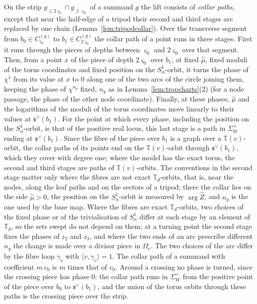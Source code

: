 On the strip $g_{\le2\varsigma_0}\cap g_{\ge\varsigma_0}$ of a summand $g$ the lift consists of \emph{collar paths}, except
that near the half-edge of a tripod their second and third stages are replaced by one chain
(Lemma~\ref{lem:tripodcollar}). Over the transverse segment from
$b_0\in C^{(g)}_{\varsigma_0}$ to $b_1\in C^{(g)}_{2\varsigma_0}$ the collar path of a point runs in three stages. First it runs
through the pieces of depths between $\varsigma_0$ and $2\varsigma_0$ over that segment. Then, from a point $x$ of the piece
of depth $2\varsigma_0$ over $b_1$, at fixed $\hat\mu$, fixed moduli of the torus coordinates and fixed position on the
$S^1_\alpha$-orbit, it turns the phase of $\chi^{\tilde v}$ from its value at $x$ to $0$ along one of the two arcs of the
circle joining them, keeping the phase of $\chi^{n_y}$ fixed, $n_y$ as in Lemma~\ref{lem:tropcharts}(2) (for a node passage,
the phase of the other node coordinate). Finally, at these phases, $\hat\mu$ and the logarithms of the moduli of the torus
coordinates move linearly to their values at $\mathfrak s^\vee(b_1)$. For the point at which every phase, including the
position on the $S^1_\alpha$-orbit, is that of the positive real locus, this last stage is a path in $\Sigma^+_W$ ending
at $\mathfrak s^\vee(b_1)$. Since the fibre of the piece over $b_1$ is a graph over a $\mathbb T(v)$-orbit, the collar paths
of its points end on the $\mathbb T(v)$-orbit through $\mathfrak s^\vee(b_1)$, which they cover with degree one; where the
model has the exact torus, the second and third stages are paths of $\mathbb T(v)$-orbits. The conventions in the second stage matter only where the fibres are not exact
$\mathbb T_d$-orbits, that is, near the nodes, along the leaf paths and on the sectors of a tripod; there the collar lies on the side
$\hat\mu>0$, the position on the $S^1_\alpha$-orbit is measured by $\arg\hat Z$, and $n_y$ is the one used by the base map.
Where the fibres are exact $\mathbb T_d$-orbits, two choices of the fixed phase or of the trivialisation of $S^1_\alpha$
differ at each stage by an element of $\mathbb T_d$, so the sets swept do not depend on them; at a turning point the second
stage fixes the phases of $z_2$ and $z_3$, and where the two ends of an arc prescribe different $n_y$ the change is made over
a divisor piece in $\Omega_e$. The two choices of the arc differ by the fibre loop $\gamma_v$ with
$\langle v,\gamma_v\rangle=1$. The collar path of a summand with coefficient $m\,v_0$ is $m$ times that of $v_0$. Around a crossing no phase is
turned, since the crossing piece has phase $0$: the collar path runs in $\Sigma^+_W$ from the positive point of the piece
over $b_0$ to $\mathfrak s^\vee(b_1)$, and the union of the torus orbits through these paths is the crossing piece over the
strip.

